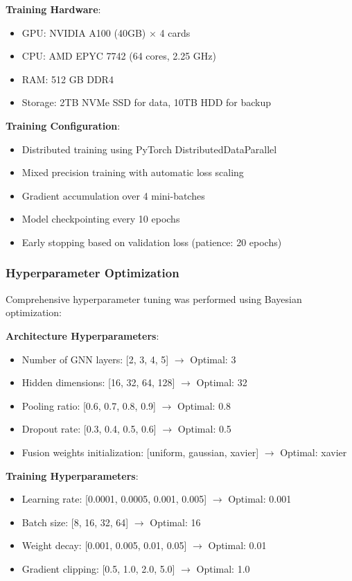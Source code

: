 \documentclass[10pt,journal,compsoc]{IEEEtran}
\begin{document}
\textbf{Training Hardware}:
\begin{itemize}
\item GPU: NVIDIA A100 (40GB) × 4 cards
\item CPU: AMD EPYC 7742 (64 cores, 2.25 GHz)
\item RAM: 512 GB DDR4
\item Storage: 2TB NVMe SSD for data, 10TB HDD for backup
\end{itemize}

\textbf{Training Configuration}:
\begin{itemize}
\item Distributed training using PyTorch DistributedDataParallel
\item Mixed precision training with automatic loss scaling
\item Gradient accumulation over 4 mini-batches
\item Model checkpointing every 10 epochs
\item Early stopping based on validation loss (patience: 20 epochs)
\end{itemize}

\subsubsection{Hyperparameter Optimization}

Comprehensive hyperparameter tuning was performed using Bayesian optimization:

\textbf{Architecture Hyperparameters}:
\begin{itemize}
\item Number of GNN layers: [2, 3, 4, 5] $\rightarrow$ Optimal: 3
\item Hidden dimensions: [16, 32, 64, 128] $\rightarrow$ Optimal: 32
\item Pooling ratio: [0.6, 0.7, 0.8, 0.9] $\rightarrow$ Optimal: 0.8
\item Dropout rate: [0.3, 0.4, 0.5, 0.6] $\rightarrow$ Optimal: 0.5
\item Fusion weights initialization: [uniform, gaussian, xavier] $\rightarrow$ Optimal: xavier
\end{itemize}

\textbf{Training Hyperparameters}:
\begin{itemize}
\item Learning rate: [0.0001, 0.0005, 0.001, 0.005] $\rightarrow$ Optimal: 0.001
\item Batch size: [8, 16, 32, 64] $\rightarrow$ Optimal: 16
\item Weight decay: [0.001, 0.005, 0.01, 0.05] $\rightarrow$ Optimal: 0.01
\item Gradient clipping: [0.5, 1.0, 2.0, 5.0] $\rightarrow$ Optimal: 1.0
\end{itemize}
\end{document}
